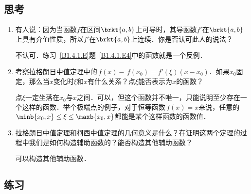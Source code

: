\subsection*{思考}

\begin{enumerate}
\item 有人说：因为当函数\(f\)在区间\(\brkt{a,b}\)上可导时，其导函数\(f'\)在\(\brkt{a,b}\)上具有介值性质，所以\(f'\)在\(\brkt{a,b}\)上连续．你是否认可此人的说法？

  \ifshowsolp
  不认可．练习~\ref{B1.4.1.E}题~\ref{B1.4.1.E4}中的函数就是一个反例．
  \fi

\item 考察拉格朗日中值定理中的\(\,f(x) - \,f(x_0) = f'(\xi)(x - x_0)\)．如果\(x_0\)固定，那么当\(x\)变化时\(\xi\)和\(x\)有什么关系？点\(\xi\)能否表示为\(x\)的函数？

  \ifshowsolp
  点\(\xi\)一定坐落在\(x_0\)与\(x\)之间．可以，但这个函数并不唯一，只能说明至少存在一个这样的函数．举个极端点的例子，对于恒等函数\(\,f(x) = x\)来说，任意的\(\minb{x_0, x} \le \xi \le \maxb{x_0, x}\)都能是某个这样函数的函数值．
  \fi

\item 拉格朗日中值定理和柯西中值定理的几何意义是什么？在证明这两个定理的过程中我们是如何构造辅助函数的？能否构造其他辅助函数？

  \ifshowsolp
  可以构造其他辅助函数．
  \fi
\end{enumerate}

\ifshowex
{}
\subsection*{练习}

